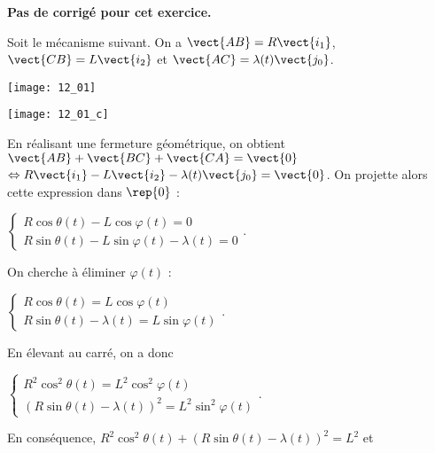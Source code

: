 \normaltrue \difficilefalse \tdifficilefalse
\correctionfalse


\setcounter{numques}{0}
\ifcorrection
\else
\textbf{Pas de corrigé pour cet exercice.}
\fi

\ifprof
\else
Soit le mécanisme suivant. On a $\vect{AB}=R\vect{i_1}$, $\vect{CB}=L\vect{i_2}$ et $\vect{AC}=\lambda(t) \vect{j_0}$. 

\begin{center}
\texttt{[image: 12\_01]}
\end{center}
\fi

\begin{center}
\texttt{[image: 12\_01\_c]}
\end{center}
\ifprof
\else
\fi

En réalisant une fermeture géométrique, on obtient 
$\vect{AB}+\vect{BC}+\vect{CA}=\vect{0}$ 
$ \Leftrightarrow R\vect{i_1} - L\vect{i_2} - \lambda(t) \vect{j_0} = \vect{0}$.
On projette alors cette expression dans $\rep{0}$ : 

$
\left\{
\begin{array}{l}
R\cos\theta(t)- L\cos\varphi(t) = 0 \\
R\sin\theta(t) - L\sin\varphi(t) - \lambda(t) = 0 
\end{array}
\right.
$.

On cherche à éliminer $\varphi(t)$ : 

$
\left\{
\begin{array}{l}
R\cos\theta(t) = L\cos\varphi(t)  \\
R\sin\theta(t)  - \lambda(t) = L\sin\varphi(t)
\end{array}
\right.
$.

En élevant au carré, on a donc 

$\left\{
\begin{array}{l}
R^2\cos^2\theta(t) = L^2\cos^2\varphi(t)  \\
\left(R\sin\theta(t)  - \lambda(t)\right)^2 = L^2\sin^2\varphi(t)
\end{array}
\right.
$.

En conséquence, 
$R^2\cos^2\theta(t)  + \left(R\sin\theta(t)  - \lambda(t)\right)^2 = L^2$ et 

